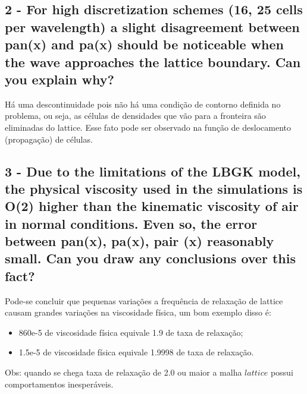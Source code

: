 \subsection{2 - For high discretization schemes (16, 25 cells per wavelength) a slight disagreement between pan(x) and
pa(x) should be noticeable when the wave approaches the lattice boundary. Can you explain why?}
Há uma descontinuidade pois não há uma condição de contorno definida no problema, ou seja, as células de densidades que vão para a fronteira são eliminadas do lattice. Esse fato pode ser observado na função de deslocamento (propagação) de células.
 
\subsection{3 - Due to the limitations of the LBGK model, the physical viscosity used in the simulations is O(2) higher
than the kinematic viscosity of air in normal conditions. Even so, the error between pan(x), pa(x),
pair (x) reasonably small. Can you draw any conclusions over this fact?} Pode-se concluir que pequenas variações a frequência de relaxação de lattice causam grandes variações na viscosidade física, um bom exemplo disso é:
\begin{itemize}
	\item 860e-5 de viscosidade física equivale 1.9 de taxa de relaxação;
	\item 1.5e-5 de viscosidade física equivale 1.9998 de taxa de relaxação.
\end{itemize}
 Obs: quando se chega taxa de relaxação de 2.0 ou maior a malha $lattice$ possui comportamentos inesperáveis.


